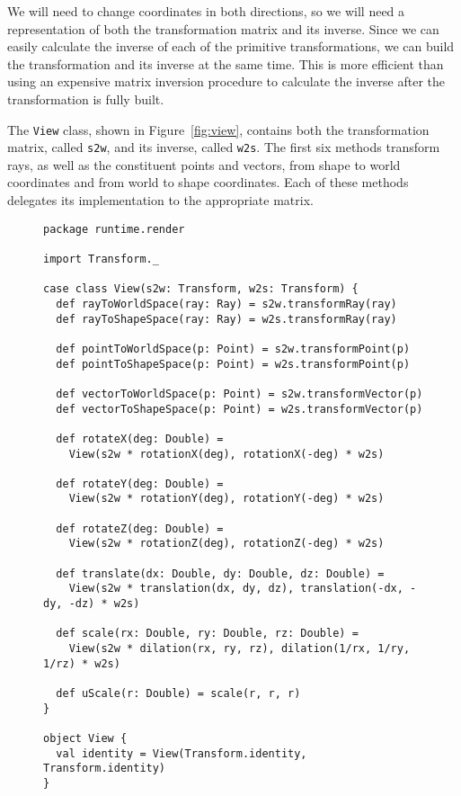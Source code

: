 We will need to change coordinates in both directions,
so we will need a representation of
both the transformation matrix and its inverse.
Since we can easily calculate the inverse of
each of the primitive transformations,
we can build the transformation and its inverse at the same time.
This is more efficient than using an expensive matrix inversion procedure
to calculate the inverse after the transformation is fully built.

The \verb!View! class, shown in Figure~\ref{fig:view},
contains both the transformation matrix, called \verb!s2w!,
and its inverse, called \verb!w2s!.
The first six methods transform rays,
as well as the constituent points and vectors,
from shape to world coordinates and from world to shape coordinates.
Each of these methods delegates its implementation to the appropriate matrix.

\begin{figure}
\begin{verbatim}
package runtime.render

import Transform._

case class View(s2w: Transform, w2s: Transform) {
  def rayToWorldSpace(ray: Ray) = s2w.transformRay(ray)
  def rayToShapeSpace(ray: Ray) = w2s.transformRay(ray)

  def pointToWorldSpace(p: Point) = s2w.transformPoint(p)
  def pointToShapeSpace(p: Point) = w2s.transformPoint(p)

  def vectorToWorldSpace(p: Point) = s2w.transformVector(p)
  def vectorToShapeSpace(p: Point) = w2s.transformVector(p)

  def rotateX(deg: Double) =
    View(s2w * rotationX(deg), rotationX(-deg) * w2s)

  def rotateY(deg: Double) =
    View(s2w * rotationY(deg), rotationY(-deg) * w2s)

  def rotateZ(deg: Double) =
    View(s2w * rotationZ(deg), rotationZ(-deg) * w2s)

  def translate(dx: Double, dy: Double, dz: Double) =
    View(s2w * translation(dx, dy, dz), translation(-dx, -dy, -dz) * w2s)

  def scale(rx: Double, ry: Double, rz: Double) =
    View(s2w * dilation(rx, ry, rz), dilation(1/rx, 1/ry, 1/rz) * w2s)

  def uScale(r: Double) = scale(r, r, r)
}

object View {
  val identity = View(Transform.identity, Transform.identity)
}
\end{verbatim}
\getcaption
\end{figure}

